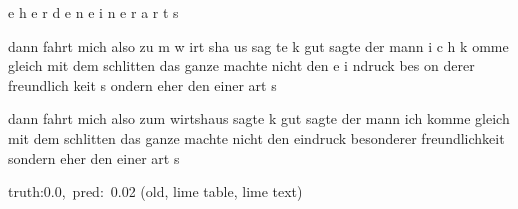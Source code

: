 \documentclass[a4paper,10pt,twoside]{article}
\begin{document}
{\color[rgb]{1,0,0} e}{\color[rgb]{0.0,0,0} h}{\color[rgb]{0.0,0,0} e}{\color[rgb]{1,0,0} r} {\color[rgb]{0.236,0,0} d}{\color[rgb]{0.0,0,0} e}{\color[rgb]{0.0,0,0} n} {\color[rgb]{1,0,0} e}{\color[rgb]{0.261,0,0} i}{\color[rgb]{0.299,0,0} n}{\color[rgb]{0.0,0,0} e}{\color[rgb]{1,0,0} r} {\color[rgb]{1,0,0} a}{\color[rgb]{1,0,0} r}{\color[rgb]{1,0,0} t} {\color[rgb]{0.0,0,0} s}

  dann fahrt mich also {\color[rgb]{1,0,0} z}u{\color[rgb]{1,0,0} m} w{\color[rgb]{1,0,0} i}rt{\color[rgb]{0,0,1} s}ha{\color[rgb]{0,0,1} u}s   sag{\color[rgb]{0,0,1} t}e k   gut   sagte der mann   i{\color[rgb]{0,0,1} c}{\color[rgb]{0,0,1} h} k{\color[rgb]{1,0,0} o}mme gleich mit dem schlitten   das ganze machte nicht den e{\color[rgb]{0,0,1} i}{\color[rgb]{1,0,0} n}druck {\color[rgb]{0,0,1} b}es{\color[rgb]{0,0,1} o}n{\color[rgb]{0,0,1} d}erer freundlich{\color[rgb]{1,0,0} k}eit  s{\color[rgb]{1,0,0} o}ndern eher den einer art s

  dann fahrt mich also zum wirtshaus sagte k gut sagte der mann ich komme gleich {\color[rgb]{0,0,1} mit} {\color[rgb]{0,0,1} dem} {\color[rgb]{0,0,1} schlitten} das ganze machte nicht den {\color[rgb]{0,0,1} eindruck} besonderer freundlichkeit {\color[rgb]{0,0,1} sondern} eher den einer art s

 {\footnotesize {\color[rgb]{0.6, 0.6, 0.6}truth:0.0,~pred:~0.02}} (old, lime table, lime text)\hrulefill
\end{document}
